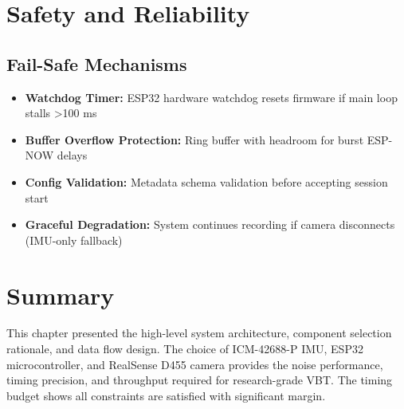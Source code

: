 \section{Safety and Reliability}

\subsection{Fail-Safe Mechanisms}

\begin{itemize}
    \item \textbf{Watchdog Timer:} ESP32 hardware watchdog resets firmware if main loop stalls >100 ms
    \item \textbf{Buffer Overflow Protection:} Ring buffer with headroom for burst ESP-NOW delays
    \item \textbf{Config Validation:} Metadata schema validation before accepting session start
    \item \textbf{Graceful Degradation:} System continues recording if camera disconnects (IMU-only fallback)
\end{itemize}

\section{Summary}

This chapter presented the high-level system architecture, component selection rationale, and data flow design. The choice of ICM-42688-P IMU, ESP32 microcontroller, and RealSense D455 camera provides the noise performance, timing precision, and throughput required for research-grade VBT. The timing budget shows all constraints are satisfied with significant margin.

\newpage